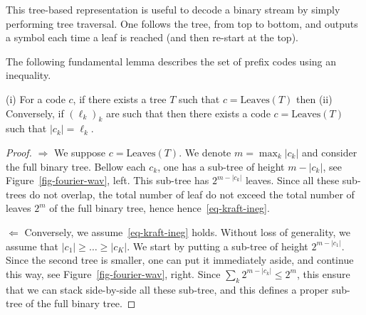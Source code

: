 
This tree-based representation is useful to decode a binary stream by simply performing tree traversal. One follows the tree, from top to bottom, and outputs a symbol each time a leaf is reached (and then re-start at the top). 

The following fundamental lemma describes the set of prefix codes using an inequality.

\begin{lem}\label{lem-kraft}
	(i) For a code $c$, if there exists a tree $T$ such that $c=\text{Leaves}(T)$ then
	(ii) Conversely, if $(\ell_k)_k$ are such that
	then there exists a code $c=\text{Leaves}(T)$ such that $|c_k|=\ell_k$.
\end{lem} 

\begin{proof}
	$\Rightarrow$ We suppose $c=\text{Leaves}(T)$. We denote $m=\max_k |c_k|$ and consider the full binary tree.
	Bellow each $c_k$, one has a sub-tree of height $m-|c_k|$, see Figure~\ref{fig-fourier-wav}, left. This sub-tree has $2^{m-|c_k|}$ leaves. Since all these sub-trees do not overlap, the total number of leaf do not exceed the total number of leaves $2^m$ of the full binary tree, hence
	hence~\eqref{eq-kraft-ineg}. 
	

	
	$\Leftarrow$ Conversely, we assume~\eqref{eq-kraft-ineg} holds. Without loss of generality, we assume that $|c_1| \geq \ldots \geq |c_K|$. We start by putting a sub-tree of height $2^{m-|c_1|}$. Since the second tree is smaller, one can put it immediately aside, and continue this way, see Figure~\ref{fig-fourier-wav}, right. Since  $\sum_k 2^{m-|c_k|} \leq 2^m$, this ensure that we can stack side-by-side all these sub-tree, and this defines a proper sub-tree of the full binary tree. 
\end{proof}


